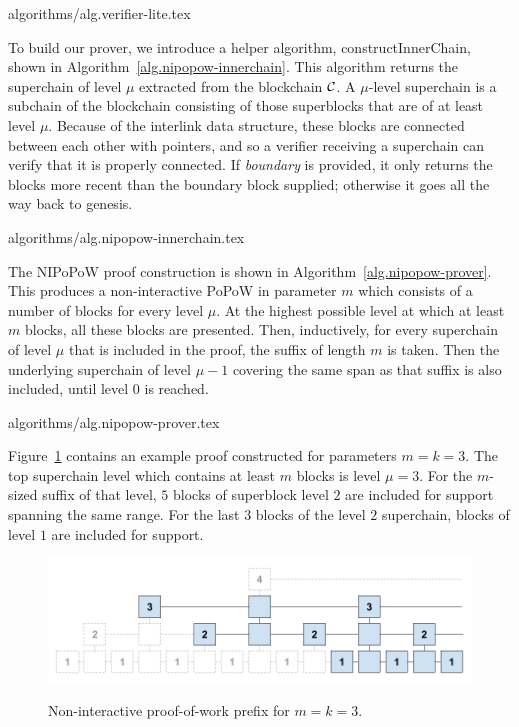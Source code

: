 {algorithms/alg.verifier-lite.tex}

To build our prover, we introduce a helper algorithm, constructInnerChain,
shown in Algorithm~\ref{alg.nipopow-innerchain}. This algorithm returns the
superchain of level $\mu$ extracted from the blockchain $\mathcal{C}$. A
$\mu$-level superchain is a subchain of the blockchain consisting of those
superblocks that are of at least level $\mu$. Because of the interlink data
structure, these blocks are connected between each other with pointers, and so
a verifier receiving a superchain can verify that it is properly connected.
If \textit{boundary} is provided, it only returns the blocks more recent than
the boundary block supplied; otherwise it goes all the way back to genesis.

{algorithms/alg.nipopow-innerchain.tex}

The NIPoPoW proof construction is shown in Algorithm~\ref{alg.nipopow-prover}.
This produces a non-interactive PoPoW in parameter $m$ which consists of a
number of blocks for every level $\mu$. At the highest possible level at which
at least $m$ blocks, all these blocks are presented. Then, inductively, for
every superchain of level $\mu$ that is included in the proof, the suffix of
length $m$ is taken. Then the underlying superchain of level $\mu - 1$ covering
the same span as that suffix is also included, until level $0$ is reached.

{algorithms/alg.nipopow-prover.tex}


Figure~\ref{fig.nipopow} contains an example proof constructed for parameters
$m = k = 3$. The top superchain level which contains at least $m$ blocks is
level $\mu = 3$. For the $m$-sized suffix of that level, $5$ blocks of
superblock level $2$ are included for support spanning the same range. For the
last $3$ blocks of the level $2$ superchain, blocks of level $1$ are included
for support.

\begin{figure}[h]
    \caption{Non-interactive proof-of-work prefix for $m=k = 3$.}
    \centering
    \includegraphics[width=\columnwidth,keepaspectratio]{figures/non-interactive-popow.png}
    \label{fig.nipopow}
\end{figure}

